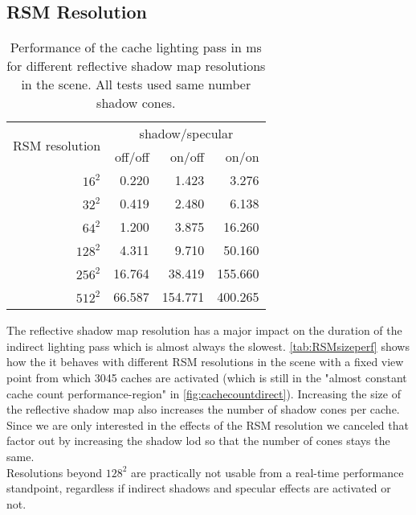\documentclass[thesis.tex]{subfiles}
\begin{document}
\subsection{RSM Resolution}
\begin{table}[htbp]
  \centering
    \begin{tabular}{r|rrr}
    \toprule
    \multirow{2}{*}{RSM resolution} & \multicolumn{3}{c}{ shadow/specular}\\
     & off/off & on/off & on/on \\
    \midrule
    $16^2$    & 0.220 & 1.423 & 3.276 \\
    $32^2$    & 0.419 & 2.480 & 6.138 \\
    $64^2$    & 1.200 & 3.875 & 16.260 \\
    $128^2$   & 4.311 & 9.710 & 50.160 \\
    $256^2$   & 16.764 & 38.419 & 155.660 \\
    $512^2$   & 66.587 & 154.771 & 400.265 \\
    \bottomrule
    \end{tabular}
\caption{Performance of the cache lighting pass in ms for different reflective shadow map resolutions in the  scene. All tests used same number shadow cones. }
\label{tab:RSMsizeperf}
\end{table}
The reflective shadow map resolution has a major impact on the duration of the indirect lighting pass which is almost always the slowest.
\autoref{tab:RSMsizeperf} shows how the it behaves with different RSM resolutions in the  scene with a fixed view point from which 3045 caches are activated (which is still in the "almost constant cache count performance-region" in \autoref{fig:cachecountdirect}).
Increasing the size of the reflective shadow map also increases the number of shadow cones per cache.
Since we are only interested in the effects of the RSM resolution we canceled that factor out by increasing the shadow lod so that the number of cones stays the same.
\\
Resolutions beyond $128^2$ are practically not usable from a real-time performance standpoint, regardless if indirect shadows and specular effects are activated or not.
\end{document}
